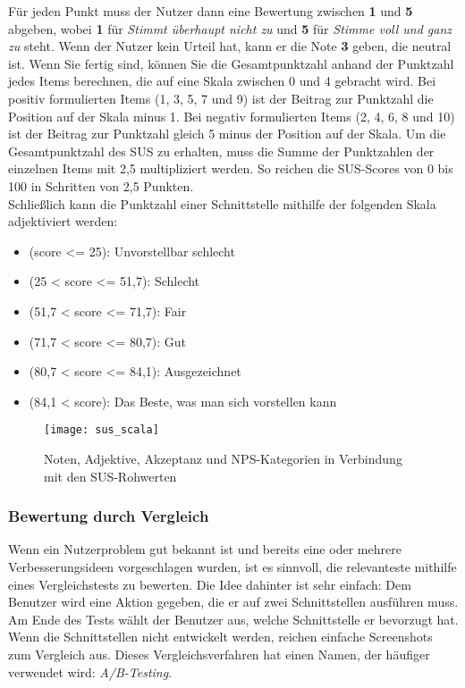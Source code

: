 Für jeden Punkt muss der Nutzer dann eine Bewertung zwischen \textbf{1} und \textbf{5} abgeben, wobei \textbf{1} für \textit{Stimmt überhaupt nicht zu} und \textbf{5} für \textit{Stimme voll und ganz zu} steht. Wenn der Nutzer kein Urteil hat, kann er die Note \textbf{3} geben, die neutral ist.
Wenn Sie fertig sind, können Sie die Gesamtpunktzahl anhand der Punktzahl jedes Items berechnen, die auf eine Skala zwischen 0 und 4 gebracht wird.
Bei positiv formulierten Items (1, 3, 5, 7 und 9) ist der Beitrag zur Punktzahl die Position auf der Skala minus 1.
Bei negativ formulierten Items (2, 4, 6, 8 und 10) ist der Beitrag zur Punktzahl gleich 5 minus der Position auf der Skala.
Um die Gesamtpunktzahl des SUS zu erhalten, muss die Summe der Punktzahlen der einzelnen Items mit 2,5 multipliziert werden.
So reichen die SUS-Scores von 0 bis 100 in Schritten von 2,5 Punkten.\\

Schließlich kann die Punktzahl einer Schnittstelle mithilfe der folgenden Skala adjektiviert werden:

\begin{itemize}
  \item (score <= 25): Unvorstellbar schlecht
  \item (25 < score <= 51,7): Schlecht
  \item (51,7 < score <= 71,7): Fair
  \item (71,7 < score <= 80,7): Gut
  \item (80,7 < score <= 84,1): Ausgezeichnet
  \item (84,1 < score): Das Beste, was man sich vorstellen kann
\end{itemize}

\begin{figure}[H]
  \centering
  \texttt{[image: sus\_scala]}
  \caption{Noten, Adjektive, Akzeptanz und NPS-Kategorien in Verbindung mit den SUS-Rohwerten\cite{sus_scala}}
  \label{fig:sus_scala}
\end{figure}

\subsubsection{Bewertung durch Vergleich}

Wenn ein Nutzerproblem gut bekannt ist und bereits eine oder mehrere Verbesserungsideen vorgeschlagen wurden, ist es sinnvoll, die relevanteste mithilfe eines Vergleichstests zu bewerten.
Die Idee dahinter ist sehr einfach: Dem Benutzer wird eine Aktion gegeben, die er auf zwei Schnittstellen ausführen muss. Am Ende des Tests wählt der Benutzer aus, welche Schnittstelle er bevorzugt hat.
Wenn die Schnittstellen nicht entwickelt werden, reichen einfache Screenshots zum Vergleich aus.
Dieses Vergleichsverfahren hat einen Namen, der häufiger verwendet wird: \textit{A/B-Testing}.

